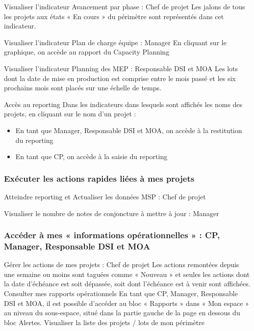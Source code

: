 Visualiser l’indicateur Avancement par phase : Chef de projet
    Les jalons de tous les projets aux états « En cours » du périmètre sont représentés dans cet indicateur.

Visualiser l’indicateur Plan de charge équipe : Manager
En cliquant sur le graphique, on accède au rapport du Capacity Planning

Visualiser l’indicateur Planning des MEP : Responsable DSI et MOA
Les lots dont la date de mise en production est comprise entre le mois passé et les six prochains mois sont placés sur une échelle de temps.

Accès au reporting
Dans les indicateurs dans lesquels sont affichés les noms des projets, en cliquant sur le nom d’un projet :
\begin{itemize}
    \item En tant que Manager, Responsable DSI et MOA, on accède à la restitution du reporting
    \item En tant que CP, on accède à la saisie du reporting
\end{itemize}
\subsubsection{Exécuter les actions rapides liées à mes projets}

Atteindre reporting et Actualiser les données MSP : Chef de projet

Visualiser le nombre de notes de conjoncture à mettre à jour : Manager


\subsubsection{Accéder à mes « informations opérationnelles » : CP, Manager, Responsable DSI et MOA}
Gérer les actions de mes projets : Chef de projet
Les actions remontées depuis une semaine ou moins sont taguées comme « Nouveau » et seules les actions dont la date d’échéance est soit dépassée, soit dont l’échéance est à venir sont affichées.
Consulter mes rapports opérationnels
En tant que CP, Manager, Responsable DSI et MOA, il est possible d’accéder au bloc « Rapports » dans « Mon espace » au niveau du sous-espace, situé dans la partie gauche de la page en dessous du bloc Alertes.
Visualiser la liste des projets / lots de mon périmètre


